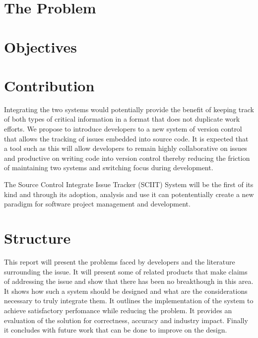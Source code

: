 \documentclass{mproj}
\begin{document}
\section{The Problem}


\section{Objectives}

\section{Contribution}

Integrating the two systems would potentially provide the benefit of keeping track of both types of critical information in a format that does not duplicate work efforts. We propose to introduce developers to a new system of version control that allows the tracking of issues embedded into source code. It is expected that a tool such as this will allow developers to remain highly collaborative on issues and productive on writing code into version control thereby reducing the friction of maintaining two systems and switching focus during development.

The Source Control Integrate Issue Tracker (SCIIT) System will be the first of its kind and through its adoption, analysis and use it can potententially create a new paradigm for software project management and development.


\section{Structure}

This report will present the problems faced by developers and the literature surrounding the issue. It will present some of related products that make claims of addressing the issue and show that there has been no breakthough in this area. It shows how such a system should be designed and what are the considerations necessary to truly integrate them. It outlines the implementation of the system to achieve satisfactory perfomance while reducing the problem. It provides an evaluation of the solution for correctness, accuracy and industry impact. Finally it concludes with future work that can be done to improve on the design.

\end{document}
